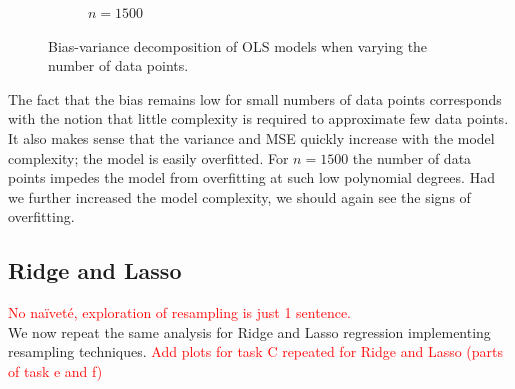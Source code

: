 \documentclass[twocolumn,english,notitlepage]{article}
\newcommand{\comment}[1]{\textcolor{red}{#1}}
\begin{document}
\begin{figure}[ht]
\begin{subfigure}{.5\textwidth}
                    \caption{$n=1500$}
                \end{subfigure}
                
                \caption{Bias-variance decomposition of OLS models when varying the number of data points.}
                \label{res:fig:bs_bias_var_data_points}
            \end{figure}
            The fact that the bias remains low for small numbers of data points corresponds with the notion that little complexity is required to approximate few data points. It also makes sense that the variance and MSE quickly increase with the model complexity; the model is easily overfitted. For $n=1500$ the number of data points impedes the model from overfitting at such low polynomial degrees. Had we further increased the model complexity, we should again see the signs of overfitting. 

    

    \subsection{Ridge and Lasso}
        \comment{No naïveté, exploration of resampling is just 1 sentence.}\\
        We now repeat the same analysis for Ridge and Lasso regression implementing resampling techniques. \comment{Add plots for task C repeated for Ridge and Lasso (parts of task e and f)}
        
\end{document}
